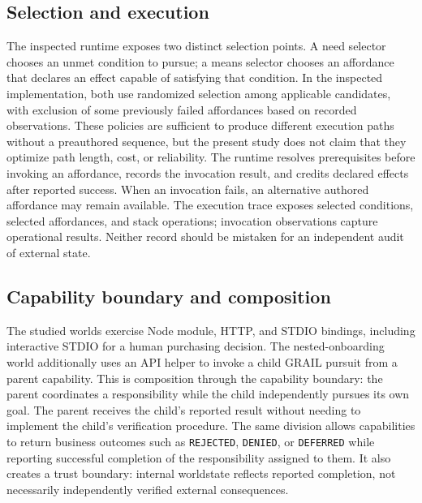 \documentclass[11pt]{article}
\begin{document}
\subsection{Selection and execution}
The inspected runtime exposes two distinct selection points. A need selector chooses an unmet condition to pursue; a means selector chooses an affordance that declares an effect capable of satisfying that condition. In the inspected implementation, both use randomized selection among applicable candidates, with exclusion of some previously failed affordances based on recorded observations. These policies are sufficient to produce different execution paths without a preauthored sequence, but the present study does not claim that they optimize path length, cost, or reliability. The runtime resolves prerequisites before invoking an affordance, records the invocation result, and credits declared effects after reported success. When an invocation fails, an alternative authored affordance may remain available. The execution trace exposes selected conditions, selected affordances, and stack operations; invocation observations capture operational results. Neither record should be mistaken for an independent audit of external state.

\subsection{Capability boundary and composition}
The studied worlds exercise Node module, HTTP, and STDIO bindings, including interactive STDIO for a human purchasing decision. The nested-onboarding world additionally uses an API helper to invoke a child GRAIL pursuit from a parent capability. This is composition through the capability boundary: the parent coordinates a responsibility while the child independently pursues its own goal. The parent receives the child's reported result without needing to implement the child's verification procedure. The same division allows capabilities to return business outcomes such as \texttt{REJECTED}, \texttt{DENIED}, or \texttt{DEFERRED} while reporting successful completion of the responsibility assigned to them. It also creates a trust boundary: internal worldstate reflects reported completion, not necessarily independently verified external consequences.
\end{document}
